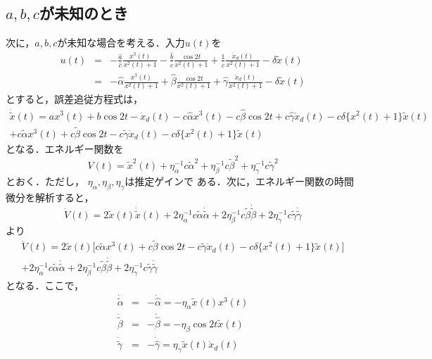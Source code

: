 \documentclass[a4paper,12pt]{jarticle}
\begin{document}
\subsection{$a,b,c$が未知のとき}
次に，$a,b,c$が未知な場合を考える．入力$u(t)$を
\begin{eqnarray}
 u(t)& = & -\frac{\hat{a}}{\hat{c}}\frac{x^3(t)}{x^2(t)+1} -\frac{\hat{b}}{\hat{c}}\frac{\cos 2t}{x^2(t)+1}
  +\frac{1}{\hat{c}}\frac{\dot{x}_d(t)}{x^2(t)+1} - \delta \tilde{x}(t) \\
  & = & -\hat{\alpha}\frac{x^3(t)}{x^2(t)+1} +\hat{\beta}\frac{\cos 2t}{x^2(t)+1}
  +\hat{\gamma}\frac{\dot{x}_d(t)}{x^2(t)+1} - \delta \tilde{x}(t)
\end{eqnarray}
%
とすると，誤差追従方程式は，
%
\begin{multline}
 \dot{\tilde{x}}(t) = ax^3(t) + b \cos 2t - \dot{x}_d(t) -c\hat{\alpha}x^3(t) -c\hat{\beta}\cos 2t
  +c\hat{\gamma}\dot{x}_d(t) - c\delta \bigl\{x^2(t) + 1 \bigr\}
 \tilde{x}(t) \\
 + c\tilde{\alpha}x^3(t) +c\tilde{\beta}\cos 2t
  -c\tilde{\gamma}\dot{x}_d(t) - c\delta \bigl\{x^2(t)+1 \bigr\}\tilde{x}(t)
\end{multline}
となる．エネルギー関数を
\begin{equation}
 V(t) = \tilde{x}^2(t) + \eta^{-1}_{\alpha}c\tilde{\alpha}^2+\eta^{-1}_{\beta}c\tilde{\beta}^2+\eta^{-1}_{\gamma}c\tilde{\gamma}^2
\end{equation}
とおく．ただし，
$\eta_{\alpha},\eta_{\beta},\eta_{\gamma}$は推定ゲインで
ある．次に，エネルギー関数の時間微分を解析すると，
%
\begin{equation}
\dot{V}(t) =  2\tilde{x}(t)\dot{\tilde{x}}(t) +
 2\eta^{-1}_{\alpha}c\tilde{\alpha}\dot{\tilde{\alpha}}
 +2\eta^{-1}_{\beta}c\tilde{\beta}\dot{\tilde{\beta}} +
 2\eta^{-1}_{\gamma}c\tilde{\gamma}\dot{\tilde{\gamma}}
\end{equation}
%
より
\begin{multline}
   \dot{V}(t)= 2\tilde{x}(t)\bigl[ c\tilde{\alpha}x^3(t) +c\tilde{\beta}\cos 2t
  -c\tilde{\gamma}\dot{x}_d(t) - c\delta \bigl\{x^2(t)+1\bigr\}
 \tilde{x}(t)\bigr]\\ 
 + 2\eta^{-1}_{\alpha}c\tilde{\alpha}\dot{\tilde{\alpha}}
 +2\eta^{-1}_{\beta}c\tilde{\beta}\dot{\tilde{\beta}} +
  2\eta^{-1}_{\gamma}c\tilde{\gamma}\dot{\tilde{\gamma}} 
\end{multline}
%
となる．ここで，
\begin{eqnarray}
\dot{\tilde{\alpha}}&=&-\dot{\hat{\alpha}}=-\eta_{\alpha}\tilde{x}(t)x^3(t) \\
\dot{\tilde{\beta}}&=&-\dot{\hat{\beta}}=-\eta_{\beta}\cos 2t \tilde{x}(t) \\
\dot{\tilde{\gamma}}&=&-\dot{\hat{\gamma}}=\eta_{\gamma}\tilde{x}(t)\dot{x}_d(t)   
\end{eqnarray}
\end{document}

